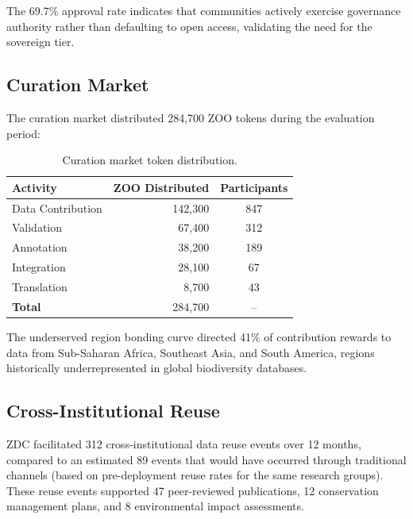 The 69.7\% approval rate indicates that communities actively exercise governance authority rather than defaulting to open access, validating the need for the sovereign tier.

\subsection{Curation Market}

The curation market distributed 284,700 ZOO tokens during the evaluation period:

\begin{table}[H]
\centering
\caption{Curation market token distribution.}
\label{tab:market}
\begin{tabular}{@{}lrc@{}}
\toprule
\textbf{Activity} & \textbf{ZOO Distributed} & \textbf{Participants} \\
\midrule
Data Contribution & 142,300 & 847 \\
Validation & 67,400 & 312 \\
Annotation & 38,200 & 189 \\
Integration & 28,100 & 67 \\
Translation & 8,700 & 43 \\
\midrule
\textbf{Total} & 284,700 & -- \\
\bottomrule
\end{tabular}
\end{table}

The underserved region bonding curve directed 41\% of contribution rewards to data from Sub-Saharan Africa, Southeast Asia, and South America, regions historically underrepresented in global biodiversity databases.

\subsection{Cross-Institutional Reuse}

ZDC facilitated 312 cross-institutional data reuse events over 12 months, compared to an estimated 89 events that would have occurred through traditional channels (based on pre-deployment reuse rates for the same research groups).
These reuse events supported 47 peer-reviewed publications, 12 conservation management plans, and 8 environmental impact assessments.

